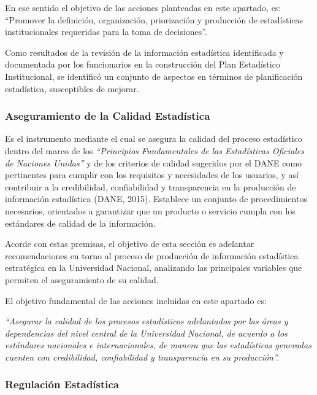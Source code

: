 \documentclass[
]{book}
\begin{document}
En ese sentido el objetivo de las acciones planteadas en este apartado, es: ``Promover la definición, organización, priorización y producción de estadísticas institucionales requeridas para la toma de decisiones''.

Como resultados de la revisión de la información estadística identificada y documentada por los funcionarios en la construcción del Plan Estadístico Institucional, se identificó un conjunto de aspectos en términos de planificación estadística, susceptibles de mejorar.

\hypertarget{aseguramiento-de-la-calidad-estaduxedstica}{%
\subsubsection{Aseguramiento de la Calidad Estadística}\label{aseguramiento-de-la-calidad-estaduxedstica}}

Es el instrumento mediante el cual se asegura la calidad del proceso estadístico dentro del marco de los \emph{``Principios Fundamentales de las Estadísticas Oficiales de Naciones Unidas''} y de los criterios de calidad sugeridos por el DANE como pertinentes para cumplir con los requisitos y necesidades de los usuarios, y así contribuir a la credibilidad, confiabilidad y transparencia en la producción de información estadística (DANE, 2015). Establece un conjunto de procedimientos necesarios, orientados a garantizar que un producto o servicio cumpla con los estándares de calidad de la información.

Acorde con estas premisas, el objetivo de esta sección es adelantar recomendaciones en torno al proceso de producción de información estadística estratégica en la Universidad Nacional, analizando las principales variables que permiten el aseguramiento de su calidad.

El objetivo fundamental de las acciones incluidas en este apartado es:

\emph{``Asegurar la calidad de los procesos estadísticos adelantados por las áreas y dependencias del nivel central de la Universidad Nacional, de acuerdo a los estándares nacionales e internacionales, de manera que las estadísticas generadas cuenten con credibilidad, confiabilidad y transparencia en su producción''.}

\hypertarget{regulaciuxf3n-estaduxedstica}{%
\subsubsection{Regulación Estadística}\label{regulaciuxf3n-estaduxedstica}}
\end{document}
